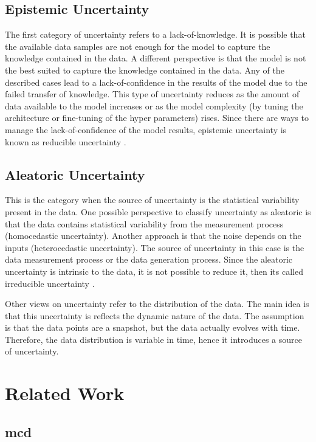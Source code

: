 \subsection{Epistemic Uncertainty}
The first category of uncertainty refers to a lack-of-knowledge. It is possible that the available data samples are not enough for the model to capture the knowledge contained in the data. A different perspective is that the model is not the best suited to capture the knowledge contained in the data. Any of the described cases lead to a lack-of-confidence in the results of the model due to the failed transfer of knowledge. This type of uncertainty reduces as the amount of data available to the model increases or as the model complexity (by tuning the architecture or fine-tuning of the hyper parameters) rises. Since there are ways to manage the lack-of-confidence of the model results, epistemic uncertainty is known as reducible uncertainty \cite{mena2021survey}.

\subsection{Aleatoric Uncertainty}
This is the category when the source of uncertainty is the statistical variability present in the data. One possible perspective to classify uncertainty as aleatoric is that the data contains statistical variability from the measurement process (homocedastic uncertainty). Another approach is that the noise depends on the inputs (heterocedastic uncertainty). The source of uncertainty in this case is the data measurement process or the data generation process. Since the aleatoric uncertainty is intrinsic to the data, it is not possible to reduce it, then its called irreducible uncertainty \cite{mena2021survey}.

Other views on uncertainty refer to the distribution of the data. The main idea is that this uncertainty is reflects the dynamic nature of the data. The assumption is that the data points are a snapshot, but the data actually evolves with time. Therefore, the data distribution is variable in time, hence it introduces a source of uncertainty.



\section{Related Work}


\subsection{\texorpdfstring{\acrfull{mcd}}{Monte-Carlo Dropout (MCD)}}

